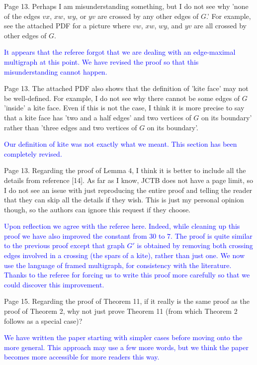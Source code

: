 \documentclass[12pt]{article}
\begin{document}
Page 13. Perhaps I am misunderstanding something, but I do not see why
'none of the edges $vx$, $xw$, $wy$, or $yv$ are crossed by any other edges of
$G$.'  For example, see the attached PDF for a picture where $vw$, $xw$, $wy$,
and $yv$ are all crossed by other edges of $G$.

\textcolor{blue}{It appears that the referee forgot that we are dealing with an edge-maximal multigraph at this point. We have revised the proof so that this misunderstanding cannot happen.}


Page 13. The attached PDF also shows that the definition of 'kite
face' may not be well-defined.  For example, I do not see why there
cannot be some edges of $G$ 'inside' a kite face.  Even if this is not
the case, I think it is more precise to say that a kite face has 'two
and a half edges' and two vertices of $G$ on its boundary' rather than
'three edges and two vertices of $G$ on its boundary'.

\textcolor{blue}{Our definition of kite was not exactly what we meant. This section has been completely revised.}

Page 13.  Regarding the proof of Lemma 4, I think it is better to
include all the details from reference [14].  As far as I know, JCTB
does not have a page limit, so I do not see an issue with just
reproducing the entire proof and telling the reader that they can skip
all the details if they wish.  This is just my personal opinion
though, so the authors can ignore this request if they choose.

\textcolor{blue}{Upon reflection we agree with the referee here. Indeed, while cleaning up this proof we have also improved the constant from $30$ to $7$. The proof is quite similar to the previous proof except that graph $G'$ is obtained by removing both crossing edges involved in a crossing (the spars of a kite), rather than just one.  We now use the language of framed multigraph, for consistency with the literature. Thanks to the referee for forcing us to write this proof more carefully so that we could discover this improvement.}

Page 15. Regarding the proof of Theorem 11, if it really is the same
proof as the proof of Theorem 2, why not just prove Theorem 11 (from
which Theorem 2 follows as a special case)?

\textcolor{blue}{We have written the paper starting with simpler cases before moving onto the more general. This approach may use a few more words, but we think the paper becomes more accessible for more readers this way.}
\end{document}
